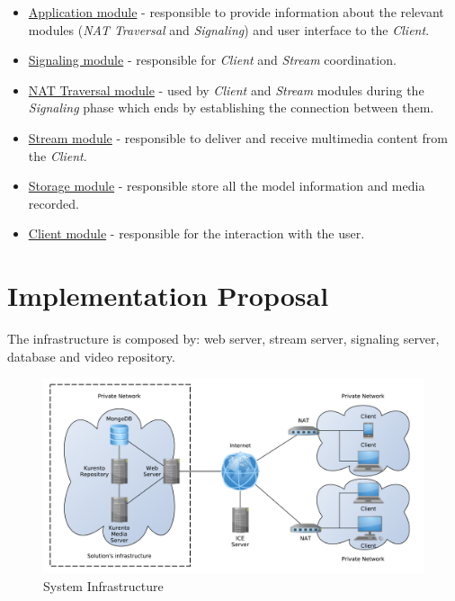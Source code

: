 \begin{itemize}

\item \underline{Application module} - responsible to provide information about the relevant modules (\emph{NAT Traversal} and \emph{Signaling}) and user interface to the \emph{Client}.

\item \underline{Signaling module} - responsible for \emph{Client} and \emph{Stream} coordination.

 \item \underline{NAT Traversal module} - used by \emph{Client} and \emph{Stream} modules during the \emph{Signaling} phase which ends by establishing the connection between them.

 \item \underline{Stream module} - responsible to deliver and receive multimedia content from the \emph{Client}. 

 \item \underline{Storage module} - responsible store all the model information and media recorded. 

 \item \underline{Client module} - responsible for the interaction with the user.

\end{itemize}




 
\section{Implementation Proposal}
The infrastructure is composed by: web server, stream server, signaling server, database and video repository.



\begin{figure}[H]
	\centering
	\includegraphics[width=\textwidth]{figures/infrastructure.pdf}
	\caption{System Infrastructure}
\end{figure}

